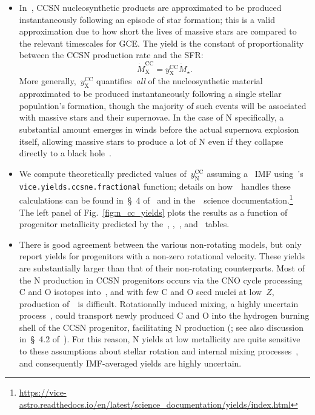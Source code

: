 \documentclass[ms.tex]{subfiles}
\begin{document}
\begin{itemize} 
	\item In~\vice, CCSN nucleosynthetic products are approximated to be 
	produced instantaneously following an episode of star formation; this is a 
	valid approximation due to how short the lives of massive stars are 
	compared to the relevant timescales for GCE. 
	The yield is the constant of proportionality between the CCSN production 
	rate and the SFR: 
	\begin{equation} 
	\dot{M}_\text{X}^\text{CC} = y_\text{X}^\text{CC}\dot{M}_\star. 
	\end{equation} 
	More generally,~$y_\text{X}^\text{CC}$ quantifies~\textit{all} of the 
	nucleosynthetic material approximated to be produced instantaneously 
	following a single stellar population's formation, though the majority of 
	such events will be associated with massive stars and their supernovae. 
	In the case of N specifically, a substantial amount emerges in winds before 
	the actual supernova explosion itself, allowing massive stars to produce 
	a lot of N even if they collapse directly to a black 
	hole~\citep{Griffith2021}. 

	\item We compute theoretically predicted values of~$y_\text{N}^\text{CC}$ 
	assuming a~\citet{Kroupa2001} IMF using~\vice's 
	\texttt{vice.yields.ccsne.fractional} function; details on how~\vice~handles 
	these calculations can be found in~\S~4 of~\citet{Griffith2021} and in 
	the~\vice~science documentation.\footnote{
		\url{https://vice-astro.readthedocs.io/en/latest/science_documentation/yields/index.html} 
	}
	The left panel of Fig.~\ref{fig:n_cc_yields} plots the results as a 
	function of progenitor metallicity predicted by the~\citet{Woosley1995}, 
	\citet{Nomoto2013},~\citet{Sukhbold2016}, and~\citet{Limongi2018} tables. 

	\item There is good agreement between the various non-rotating models, but 
	only~\citet{Limongi2018} report yields for progenitors with a non-zero 
	rotational velocity. 
	These yields are substantially larger than that of their non-rotating 
	counterparts. 
	Most of the N production in CCSN progenitors occurs via the CNO cycle 
	processing C and O isotopes into~\Nfourteen, and with few C and O seed 
	nuclei at low~$Z$, production of~\Nfourteen~is difficult. 
	Rotationally induced mixing, a highly uncertain process~\citep{Zahn1992, 
	Maeder1998, Lagarde2012}, could transport newly produced C and O into the 
	hydrogen burning shell of the CCSN progenitor, facilitating N production 
	(\citealp{Frischknecht2016}; see also discussion in~\S~4.2 
	of~\citealp{Andrews2017}). 
	For this reason, N yields at low metallicity are quite sensitive to these 
	assumptions about stellar rotation and internal mixing 
	processes~\citep{Heger2010}, and consequently IMF-averaged yields are 
	highly uncertain. 


\end{itemize}
\end{document}
